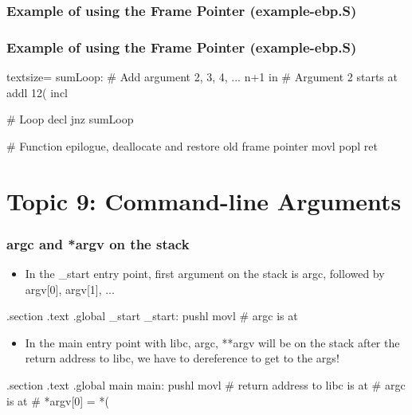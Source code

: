 \documentclass[11pt,xcolor=dvipsnames]{beamer}
\newcommand{\mvs}{\vspace{-0.95em}}
\begin{document}
\begin{frame}[fragile,t]
\frametitle{Example of using the Frame Pointer (example-ebp.S)}
\mvs
{}
\end{frame}

\begin{frame}[fragile,t]
\frametitle{Example of using the Frame Pointer (example-ebp.S)}
\mvs
\begin{gascode*}{textsize=}
    sumLoop:
      # Add argument 2, 3, 4, ... n+1 in %
      # Argument 2 starts at %
      addl 12(%
      incl %

      # Loop
      decl %
      jnz sumLoop

    # Function epilogue, deallocate and restore old frame pointer
    movl %
    popl %
    ret
\end{gascode*}
\end{frame}

\section{Topic 9: Command-line Arguments}

\begin{frame}[fragile,t]
\frametitle{{\ttfamily argc} and {\ttfamily **argv} on the stack}
\mvs
\begin{itemize}
  \item In the {\ttfamily \_start} entry point, first argument on the stack is {\ttfamily argc}, followed by {\ttfamily argv[0], argv[1], ...}
\end{itemize}
\begin{gascode}
.section .text
.global _start
_start:
  pushl %
  movl %
  # argc is at %
\end{gascode}
\begin{itemize}
  \item In the {\ttfamily main} entry point with libc, {\ttfamily argc, **argv} will be on the stack after the return address to libc, we have to dereference to get to the args!
\end{itemize}
\begin{gascode}
.section .text
.global main
main:
  pushl %
  movl %
  # return address to libc is at %
  # argc is at %
  # *argv[0] = *(%
\end{gascode}
\end{frame}
\end{document}
